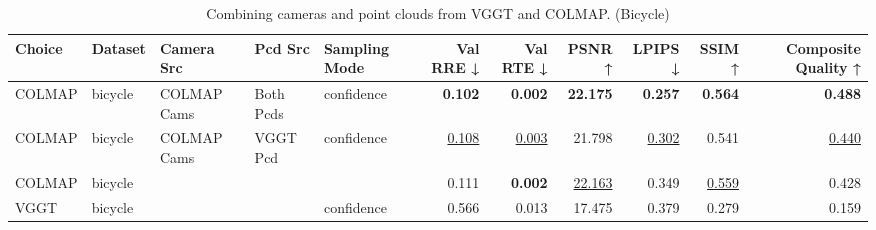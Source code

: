 \begin{table}[H]
\caption{\ifdefined\customcaption \customcaption \else Combining cameras and point clouds from VGGT and COLMAP. (Bicycle) \fi}
\label{tab:07_combined_single_brief_bicycle}
\centering
\tiny
\begin{tabular}{lllllrrrrrr}
\toprule
Choice & Dataset & Camera Src & Pcd Src & Sampling Mode & Val RRE ↓ & Val RTE ↓ & PSNR ↑ & LPIPS ↓ & SSIM ↑ & Composite Quality ↑ \\
\midrule
COLMAP & bicycle & COLMAP Cams & Both Pcds & confidence & \textbf{0.102} & \textbf{0.002} & \textbf{22.175} & \textbf{0.257} & \textbf{0.564} & \textbf{0.488} \\
COLMAP & bicycle & COLMAP Cams & VGGT Pcd & confidence & \underline{0.108} & \underline{0.003} & 21.798 & \underline{0.302} & 0.541 & \underline{0.440} \\
COLMAP & bicycle &  &  &  & 0.111 & \textbf{0.002} & \underline{22.163} & 0.349 & \underline{0.559} & 0.428 \\
VGGT & bicycle &  &  & confidence & 0.566 & 0.013 & 17.475 & 0.379 & 0.279 & 0.159 \\
\bottomrule
\end{tabular}
\end{table}